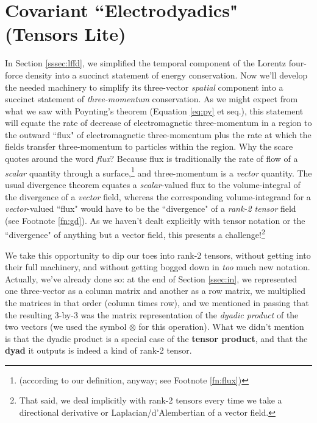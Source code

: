 \documentclass[12pt]{article}
\begin{document}
\clearpage

\section[Covariant “Electrodyadics” (Tensors Lite)]{Covariant ``Electrodyadics" (Tensors Lite)}\label{sec:dy}

In Section \ref{sssec:lffd}, we simplified the temporal component of the Lorentz four-force density into a succinct statement of energy conservation. Now we'll develop the needed machinery to simplify its three-vector \emph{spatial} component into a succinct statement of \emph{three-momentum} conservation. As we might expect from what we saw with Poynting's theorem (Equation \ref{eq:py} et seq.), this statement will equate the rate of decrease of electromagnetic three-momentum in a region to the outward ``flux" of electromagnetic three-momentum plus the rate at which the fields transfer three-momentum to particles within the region. Why the scare quotes around the word \emph{flux}? Because flux is traditionally the rate of flow of a \emph{scalar} quantity through a surface,\footnote{(according to our definition, anyway; see Footnote \ref{fn:flux})} and three-momentum is a \emph{vector} quantity. The usual divergence theorem equates a \emph{scalar}-valued flux to the volume-integral of the divergence of a \emph{vector} field, whereas the corresponding volume-integrand for a \emph{vector}-valued ``flux" would have to be the ``divergence" of a \emph{rank-2 tensor} field (see Footnote \ref{fn:gd}). As we haven't dealt explicitly with tensor notation or the ``divergence" of anything but a vector field, this presents a challenge!\footnote{That said, we deal implicitly with rank-2 tensors every time we take a directional derivative or Laplacian/d'Alembertian of a vector field.}

We take this opportunity to dip our toes into rank-2 tensors, without getting into their full machinery, and without getting bogged down in \emph{too} much new notation. Actually, we've already done so: at the end of Section \ref{ssec:in}, we represented one three-vector as a column matrix and another as a row matrix, we multiplied the matrices in that order (column times row), and we mentioned in passing that the resulting 3-by-3 was the matrix representation of the \emph{dyadic product} of the two vectors (we used the symbol $\otimes$ for this operation). What we didn't mention is that the dyadic product is a special case of the \textbf{tensor product}, and that the \textbf{dyad} it outputs is indeed a kind of rank-2 tensor.
\end{document}
